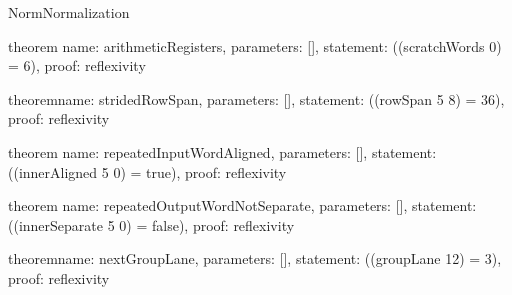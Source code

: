 \begin{lexlean}{NormNormalization}
\begin{semanticmodule}
theorem{
  name: arithmeticRegisters,
  parameters: [],
  statement: ((scratchWords 0) = 6),
  proof: reflexivity{}
}

theorem{name: stridedRowSpan, parameters: [], statement: ((rowSpan 5 8) = 36), proof: reflexivity{}}

theorem{
  name: repeatedInputWordAligned,
  parameters: [],
  statement: ((innerAligned 5 0) = true),
  proof: reflexivity{}
}

theorem{
  name: repeatedOutputWordNotSeparate,
  parameters: [],
  statement: ((innerSeparate 5 0) = false),
  proof: reflexivity{}
}

theorem{name: nextGroupLane, parameters: [], statement: ((groupLane 12) = 3), proof: reflexivity{}}
\end{semanticmodule}
\end{lexlean}
